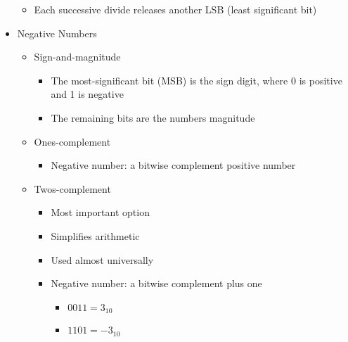 \begin{itemize}
\begin{itemize}
      \item Each successive divide releases another LSB (least significant bit)

    \end{itemize}

  \item Negative Numbers

    \begin{itemize}

      \item Sign-and-magnitude

        \begin{itemize}

          \item The most-significant bit (MSB) is the sign digit, where 0 is positive and 1 is negative

          \item The remaining bits are the numbers magnitude

        \end{itemize}

      \item Ones-complement

        \begin{itemize}

          \item Negative number: a bitwise complement positive number

        \end{itemize}

      \item Twos-complement

        \begin{itemize}

          \item Most important option

          \item Simplifies arithmetic

          \item Used almost universally
            
          \item Negative number: a bitwise complement plus one

            \begin{itemize}

              \item $0011=3_{10}$

              \item $1101=-3_{10}$


\end{itemize}
\end{itemize}
\end{itemize}
\end{itemize}
